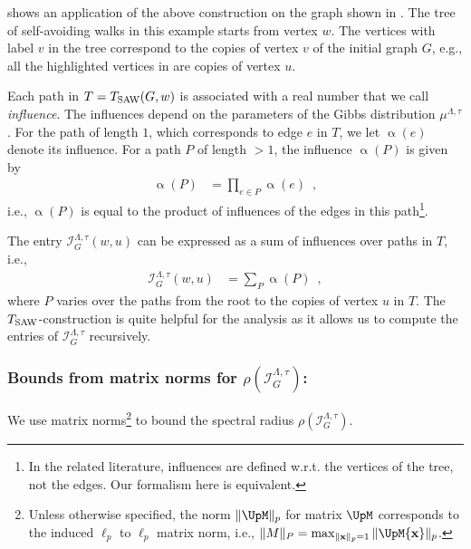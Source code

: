 \documentclass[11pt,reqno]{amsart}
\numberwithin{equation}{section}
\newcommand{\cI}{{\mathcal{I}}}
\newcommand{\blue}[1]{{\color{blue}#1}}
\newcommand{\electricviolet}[1]{{\color{electricviolet}#1}}
\newcommand{\goldenbrown}[1]{{\color{goldenbrown}#1}}
\newcommand{\red}[1]{{\color{red}#1}}
\newcommand{\Tsaw}{T_{\rm SAW}}
\newcommand{\infmatrix}{\cI}
\newcommand{\spradius}{{\rho}}
\newcommand{\norm}[2]{\goldenbrown{\|} #1 \goldenbrown{\|}_{#2}}
\renewcommand{\blue}[1]{#1}
\renewcommand{\electricviolet}[1]{#1}
\renewcommand{\goldenbrown}[1]{#1}
\renewcommand{\red}[1]{#1}
\newcommand{\ke}{\blue{e}}
\newcommand{\kP}{\goldenbrown{P}}
\newcommand{\ku}{\red{u}}
\newcommand{\kv}{\electricviolet{v}}
\newcommand{\kw}{\blue{w}}
\renewcommand{\ke}{e}
\renewcommand{\kP}{P}
\renewcommand{\ku}{u}
\renewcommand{\kv}{v}
\renewcommand{\kw}{w}
\newcommand{\infweight}{\upalpha}
\begin{document}
 shows an application of the above construction on the  graph shown in 
.  The tree of self-avoiding walks in this example starts from vertex $\kw$. 
%
The vertices with label $\kv$ in the tree  correspond to the copies of  vertex $\kv$ of the initial 
graph $G$,  e.g., all the highlighted vertices in  are copies of vertex $\ku$. 



Each path in $T=\Tsaw(G,\kw)$ is associated with a real number that we call {\em influence}. 
The influences depend on the parameters of the Gibbs distribution $\mu^{\Lambda,\tau}$. 
%
For the path of length $1$, which corresponds to  edge $\ke$ in $T$, we let $\infweight(\ke)$ denote 
its influence. For a path $\kP$ of length $>1$, the influence $\infweight(\kP)$ is given by
\begin{align}\nonumber
\infweight(\kP) &= \prod\nolimits_{\ke\in \kP}\infweight(\ke) \enspace,
\end{align}
i.e., $\infweight(\kP)$ is equal to the product  of influences of the edges in this path\footnote{In the 
related literature, influences are defined w.r.t. the vertices of the tree, not the edges. Our formalism 
here is equivalent.}.

The entry $\infmatrix^{\Lambda,\tau}_{G}(\kw,\ku)$ can be expressed
as a sum of influences over paths in $T$, i.e., 
\begin{align}\nonumber %
\infmatrix^{\Lambda,\tau}_{G}(\kw,\ku) & =\sum\nolimits_{\kP} \infweight(\kP) \enspace,
\end{align}
where $\kP$ varies over the paths from the root to the copies of vertex $\ku$ in $T$. 
%
The $\Tsaw$-construction is quite helpful for the analysis as it allows us to   compute 
the entries of $\infmatrix^{\Lambda,\tau}_{G}$ recursively. 







\subsubsection*{Bounds from matrix norms for $\spradius(\infmatrix^{\Lambda,\tau}_{G})$:}
We use  matrix norms\footnote{Unless otherwise specified, the norm $\norm{\UpM}{p}$ for matrix $\UpM$ corresponds to the induced $\ell_p$ to $\ell_p$ matrix norm, i.e., 
$\norm{M}{P}=\max_{\norm{{\bf x}}{p}=1}\norm{\UpM{\bf x}}{p}$. } to bound the spectral radius $\spradius(\infmatrix^{\Lambda,\tau}_{G})$. 
\end{document}
